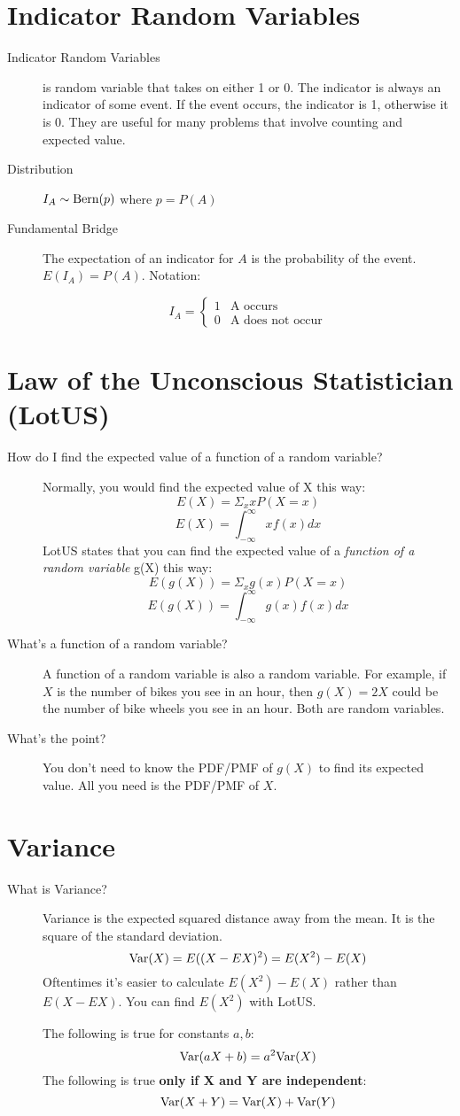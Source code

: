 \documentclass[11pt]{article}
\begin{document}
\section*{Indicator Random Variables}
\begin{description}
\item[Indicator Random Variables] is random variable that takes on either 1 or 0. The indicator is always an indicator of some event. If the event occurs, the indicator is 1, otherwise it is 0. They are useful for many problems that involve counting and expected value.
\item[Distribution] $I_A \sim \textrm{Bern}(p)$ where $p = P(A)$
\item[Fundamental Bridge] The expectation of an indicator for $A$ is the probability of the event. $E(I_A) = P(A)$. Notation:

\[
I_A =
 \begin{cases}
   1 & \text{A occurs} \\
   0 & \text{A does not occur}
  \end{cases}
\]
\end{description}

\section*{Law of the Unconscious Statistician (LotUS)}
\begin{description}
\item[How do I find the expected value of a function of a random variable?]
Normally, you would find the expected value of X this way:
\[E(X) = \Sigma_x xP(X=x) \]
\[E(X) = \int^\infty_{-\infty}xf(x)dx \]
LotUS states that you can find the expected value of a \emph{function of a random variable} g(X) this way:
\[E(g(X)) = \Sigma_x g(x)P(X=x) \]
\[E(g(X)) = \int^\infty_{-\infty}g(x)f(x)dx \]
\item[What's a function of a random variable?] A function of a random variable is also a random variable. For example, if $X$ is the number of bikes you see in an hour, then $g(X) =  2X$ could be the number of bike wheels you see in an hour. Both are random variables.
\item[What's the point?] You don't need to know the PDF/PMF of $g(X)$ to find its expected value. All you need is the PDF/PMF of $X$.
\end{description}


\section*{Variance}
\begin{description}
\item[What is Variance?] Variance is the expected squared distance away from the mean. It is the square of the standard deviation.
\[\textrm{Var}(X) = E((X - EX)^2) = E(X^2) - E(X) \]
Oftentimes it's easier to calculate $E(X^2) - E(X)$ rather than $E(X - EX)$. You can find $E(X^2)$ with LotUS.

The following is true for constants $a, b$:
\[\textrm{Var}(aX + b) = a^2\textrm{Var}(X)\]
The following is true \textbf{only if X and Y are independent}:
\[\textrm{Var}(X + Y) = \textrm{Var}(X) + \textrm{Var}(Y)\]
\end{description}
\end{document}
